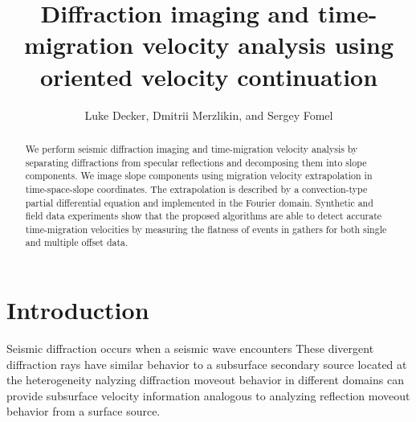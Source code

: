 \title{Diffraction imaging and time-migration velocity analysis using oriented velocity continuation}

\author{Luke Decker, Dmitrii Merzlikin, and Sergey Fomel}

\maketitle

\address{
Bureau of Economic Geology, \\
Jackson School of Geosciences \\
The University of Texas at Austin \\
University Station, Box X \\
Austin, TX 78713-8924}

\begin{abstract}
We perform seismic diffraction imaging and time-migration velocity analysis by
separating diffractions from specular reflections and decomposing them
into slope components. We image slope components using migration velocity extrapolation in time-space-slope coordinates. The
extrapolation is described by a convection-type partial differential
equation and implemented  in the Fourier domain. Synthetic
and field data experiments show that the proposed algorithms are able to
detect accurate time-migration velocities by measuring
the flatness of events in  gathers for both single and multiple offset data.
\end{abstract}

\section{Introduction}

Seismic diffraction occurs when a seismic wave encounters   These divergent diffraction
rays have similar behavior to a subsurface secondary source located at the 
heterogeneity \cite[]{keller}nalyzing diffraction moveout behavior
in different domains can provide subsurface velocity information analogous 
to analyzing reflection moveout behavior from a surface source.


